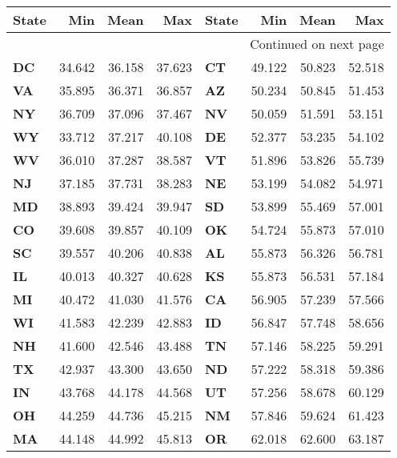 \begin{longtable}{lrrr|lrrr}
\textbf{State} &  \textbf{Min} &  \textbf{Mean} &  \textbf{Max} & \textbf{State} &  \textbf{Min} &  \textbf{Mean} &  \textbf{Max} \\
\midrule
\endhead
\midrule
\multicolumn{8}{r}{{Continued on next page}} \\
\midrule
\endfoot
\endlastfoot

\textbf{DC} &   34.642 & 36.158 &   37.623 & \textbf{CT} &   49.122 & 50.823 &   52.518 \\
\textbf{VA} &   35.895 & 36.371 &   36.857 & \textbf{AZ} &   50.234 & 50.845 &   51.453 \\
\textbf{NY} &   36.709 & 37.096 &   37.467 & \textbf{NV} &   50.059 & 51.591 &   53.151 \\
\textbf{WY} &   33.712 & 37.217 &   40.108 & \textbf{DE} &   52.377 & 53.235 &   54.102 \\
\textbf{WV} &   36.010 & 37.287 &   38.587 & \textbf{VT} &   51.896 & 53.826 &   55.739 \\
\textbf{NJ} &   37.185 & 37.731 &   38.283 & \textbf{NE} &   53.199 & 54.082 &   54.971 \\
\textbf{MD} &   38.893 & 39.424 &   39.947 & \textbf{SD} &   53.899 & 55.469 &   57.001 \\
\textbf{CO} &   39.608 & 39.857 &   40.109 & \textbf{OK} &   54.724 & 55.873 &   57.010 \\
\textbf{SC} &   39.557 & 40.206 &   40.838 & \textbf{AL} &   55.873 & 56.326 &   56.781 \\
\textbf{IL} &   40.013 & 40.327 &   40.628 & \textbf{KS} &   55.873 & 56.531 &   57.184 \\
\textbf{MI} &   40.472 & 41.030 &   41.576 & \textbf{CA} &   56.905 & 57.239 &   57.566 \\
\textbf{WI} &   41.583 & 42.239 &   42.883 & \textbf{ID} &   56.847 & 57.748 &   58.656 \\
\textbf{NH} &   41.600 & 42.546 &   43.488 & \textbf{TN} &   57.146 & 58.225 &   59.291 \\
\textbf{TX} &   42.937 & 43.300 &   43.650 & \textbf{ND} &   57.222 & 58.318 &   59.386 \\
\textbf{IN} &   43.768 & 44.178 &   44.568 & \textbf{UT} &   57.256 & 58.678 &   60.129 \\
\textbf{OH} &   44.259 & 44.736 &   45.215 & \textbf{NM} &   57.846 & 59.624 &   61.423 \\
\textbf{MA} &   44.148 & 44.992 &   45.813 & \textbf{OR} &   62.018 & 62.600 &   63.187 \\

\end{longtable}
